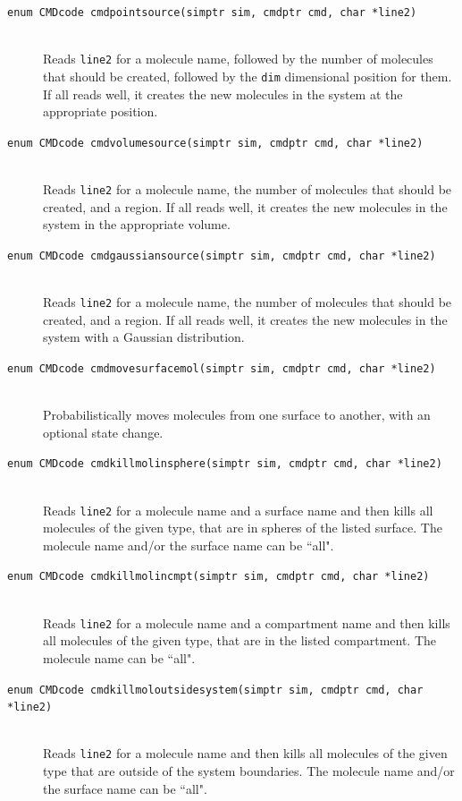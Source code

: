 \documentclass {scrbook}
\newcommand {\ttt} {\texttt}
\begin{document}
\begin{description}
\item[\ttt{enum CMDcode cmdpointsource(simptr sim, cmdptr cmd, char *line2)}]
\hfill \\
Reads \ttt{line2} for a molecule name, followed by the number of molecules that should be created, followed by the \ttt{dim} dimensional position for them. If all reads well, it creates the new molecules in the system at the appropriate position.

\item[\ttt{enum CMDcode cmdvolumesource(simptr sim, cmdptr cmd, char *line2)}]
\hfill \\
Reads \ttt{line2} for a molecule name, the number of molecules that should be created, and a region. If all reads well, it creates the new molecules in the system in the appropriate volume.

\item[\ttt{enum CMDcode cmdgaussiansource(simptr sim, cmdptr cmd, char *line2)}]
\hfill \\
Reads \ttt{line2} for a molecule name, the number of molecules that should be created, and a region. If all reads well, it creates the new molecules in the system with a Gaussian distribution.

\item[\ttt{enum CMDcode cmdmovesurfacemol(simptr sim, cmdptr cmd, char *line2)}]
\hfill \\
Probabilistically moves molecules from one surface to another, with an optional state change.

\item[\ttt{enum CMDcode cmdkillmolinsphere(simptr sim, cmdptr cmd, char *line2)}]
\hfill \\
Reads \ttt{line2} for a molecule name and a surface name and then kills all molecules of the given type, that are in spheres of the listed surface. The molecule name and/or the surface name can be ``all".

\item[\ttt{enum CMDcode cmdkillmolincmpt(simptr sim, cmdptr cmd, char *line2)}]
\hfill \\
Reads \ttt{line2} for a molecule name and a compartment name and then kills all molecules of the given type, that are in the listed compartment. The molecule name can be ``all".

\item[\ttt{enum CMDcode cmdkillmoloutsidesystem(simptr sim, cmdptr cmd, char *line2)}]
\hfill \\
Reads \ttt{line2} for a molecule name and then kills all molecules of the given type that are outside of the system boundaries. The molecule name and/or the surface name can be ``all".


\end{description}
\end{document}
